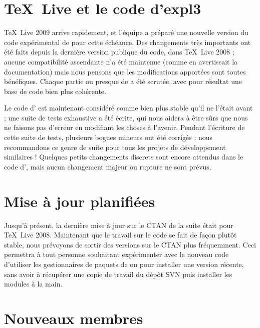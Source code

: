 




\section{\TeX\ Live et le code d'expl3}

\TeX\ Live 2009 arrive rapidement, et l'équipe \latexx a préparé une nouvelle
version du code expérimental de \latexx pour cette échéance. Des changements
très importants ont été faits depuis la dernière version publique du code,
dans \TeX\ Live 2008 ; aucune compatibilité ascendante n'a été maintenue (comme
en avertissait la documentation) mais nous pensons que les modifications
apportées sont toutes bénéfiques. Chaque partie ou presque de  a été
scrutée, avec pour résultat une base de code bien plus cohérente.

Le code d' est maintenant considéré comme bien plus stable qu'il ne
l'était avant ; une suite de tests exhaustive a été écrite, qui nous aidera à
être sûrs que nous ne faisons pas d'erreur en modifiant les choses à l'avenir.
Pendant l'écriture de cette suite de tests, plusieurs bogues mineurs ont été
corrigés ; nous recommandons ce genre de suite pour tous les projets de
développement similaires ! Quelques petits changements discrets sont encore
attendus dans le code d', mais aucun changement majeur ou rupture ne
sont prévus.

\section{Mise à jour planifiées}

Jusqu'à présent, la dernière mise à jour sur le CTAN de la suite 
était pour \TeX\ Live 2008. Maintenant que le travail sur le code se fait de
façon plutôt stable, nous prévoyons de sortir des versions sur le CTAN plus
fréquemment. Ceci permettra à tout personne souhaitant expérimenter avec le
nouveau code d'utiliser les gestionnaires de paquets de \texlive ou \miktex
pour installer une version récente, sans avoir à récupérer une copie de
travail du dépôt SVN puis installer les modules à la main.

\section{Nouveaux membres}

